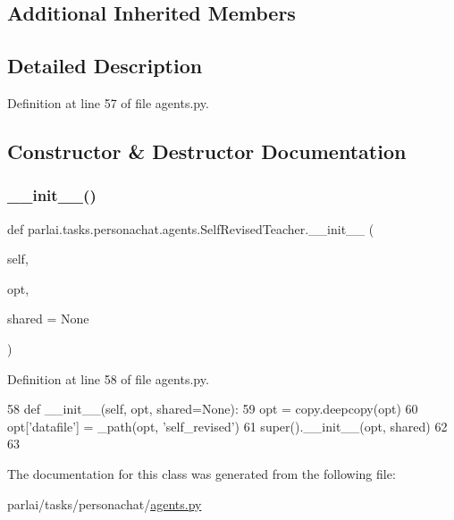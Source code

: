 \subsection*{Additional Inherited Members}


\subsection{Detailed Description}


Definition at line 57 of file agents.\+py.



\subsection{Constructor \& Destructor Documentation}
\mbox{\label{classparlai_1_1tasks_1_1personachat_1_1agents_1_1SelfRevisedTeacher_a7d6545ffc585ee5edc99b2ce5a117aeb}} 
\subsubsection{\texorpdfstring{\+\_\+\+\_\+init\+\_\+\+\_\+()}{\_\_init\_\_()}}
{\footnotesize\ttfamily def parlai.\+tasks.\+personachat.\+agents.\+Self\+Revised\+Teacher.\+\_\+\+\_\+init\+\_\+\+\_\+ (\begin{DoxyParamCaption}\item[{}]{self,  }\item[{}]{opt,  }\item[{}]{shared = {\ttfamily None} }\end{DoxyParamCaption})}



Definition at line 58 of file agents.\+py.


\begin{DoxyCode}
58     \textcolor{keyword}{def }\_\_init\_\_(self, opt, shared=None):
59         opt = copy.deepcopy(opt)
60         opt[\textcolor{stringliteral}{'datafile'}] = \_path(opt, \textcolor{stringliteral}{'self\_revised'})
61         super().\_\_init\_\_(opt, shared)
62 
63 
\end{DoxyCode}


The documentation for this class was generated from the following file\+:\begin{DoxyCompactItemize}
\item 
parlai/tasks/personachat/\hyperlink{parlai_2tasks_2personachat_2agents_8py}{agents.\+py}\end{DoxyCompactItemize}
